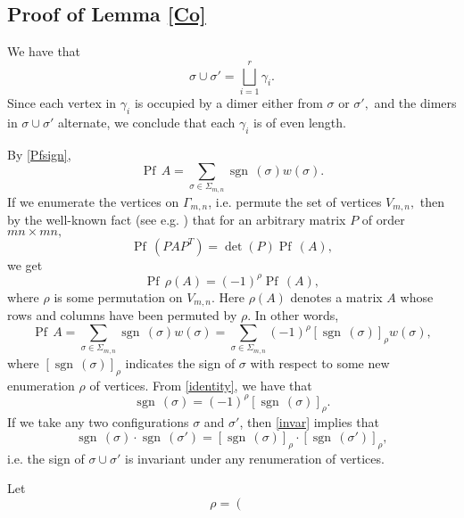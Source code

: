 \documentclass[12pt,reqno]{amsart}
\numberwithin{equation}{section}
\newcommand{\ga}{\gamma}
\newcommand{\Ga}{\Gamma}
\newcommand{\sg}{\sigma}
\newcommand{\Sg}{\Sigma}
\newcommand{\Pf}{{\operatorname{Pf}\,}}
\newcommand{\sgn}{{\operatorname{sgn}\,}}
\begin{document}
\begin{appendix}

\section{Proof of Lemma \ref{Co}} \label{appA}

We have that 
\begin{equation}\label{sqcup}
\sg\cup\sg'=\bigsqcup_{i=1}^{r}\ga_i.
\end{equation}
Since each vertex in $\ga_i$ is occupied by a dimer either from  $\sg$ or $\sg',$ and the dimers in $\sg\cup\sg'$ alternate, we conclude that each $\ga_i$ is of even length.
\par
By \eqref{Pfsign}, 
\begin{equation}
\Pf A=\sum_{\sg\in\Sg_{m,n}}\sgn(\sg)w(\sg). 
\end{equation} 
If we enumerate the vertices on $\Ga_{m,n}$, i.e. permute the set of vertices $V_{m,n},$ then by the well-known fact (see e.g. \cite{Godsil}) that for an arbitrary matrix $P$ of order $mn\times mn,$ 
\begin{equation}\label{fact}
\Pf(PAP^{T})=\det(P)\Pf(A),
\end{equation}
we get 
\begin{equation}
\Pf \rho(A)=(-1)^{\rho}\Pf(A),
\end{equation}
where $\rho$ is some permutation on $V_{m,n}.$ Here $\rho(A)$ denotes a matrix $A$ whose rows and columns have been permuted by $\rho.$ In other words,
\begin{equation}\label{identity}
\Pf A=\sum_{\sg\in\Sg_{m,n}}\sgn(\sg)w(\sg)=\sum_{\sg\in\Sg_{m,n}}(-1)^{\rho}[\sgn(\sg)]_{\rho}w(\sg),
\end{equation}
where $[\sgn(\sg)]_{\rho}$ indicates the sign of $\sg$ with respect to some new enumeration $\rho$ of vertices. From \eqref{identity}, we have that
\begin{equation}\label{invar}
\sgn(\sg)=(-1)^{\rho}[\sgn(\sg)]_{\rho}.
\end{equation}
If we take any two configurations $\sg$ and $\sg'$, then \eqref{invar} implies that \begin{equation}\label{rho}
\sgn(\sg)\cdot\sgn(\sg')=[\sgn(\sg)]_{\rho}\cdot[\sgn(\sg')]_{\rho},
\end{equation}
i.e. the sign of $\sg\cup\sg'$ is invariant under any renumeration of vertices.
\par
Let
\begin{equation}
  \rho = \left(\begin{matrix}

\end{matrix}
\end{equation}
\end{appendix}
\end{document}
